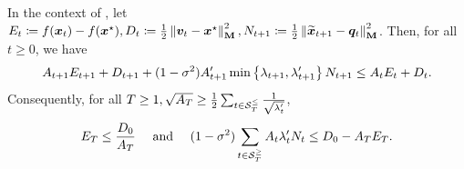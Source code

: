 \begin{lemma}
\label{lemma:ms_acceleration_potential}
In the context of , let $E_t \coloneqq f(\bm{x}_t) - f(\bm{x}^{\star}), D_t \coloneqq \frac{1}{2}\left\lVert \bm{v}_t-\bm{x}^{\star} \right\rVert_{\mathbf{M}}^2, N_{t+1} \coloneqq \frac{1}{2}\left\lVert \widetilde{\bm{x}}_{t+1}-\bm{q}_t \right\rVert_{\mathbf{M}}^2$. Then, for all $t \ge 0$, we have
\begin{align*}
    A_{t+1}E_{t+1}+D_{t+1}+(1-\sigma^2)A_{t+1}'\min\left\{\lambda_{t+1},\lambda_{t+1}'\right\}N_{t+1} \le A_tE_t+D_t.
\end{align*}
Consequently, for all $T\ge1, \sqrt{A_T}\ge\frac{1}{2}\sum_{t \in \mathcal{S}_{T}^{\le}} \frac{1}{\sqrt{\lambda_t'}}$,
\begin{align*}
    E_{T} \le \frac{D_0}{A_T} \quad \text{ and } \quad (1-\sigma^2)\sum_{t \in \mathcal{S}_{T}^{\ge}} A_t\lambda_t'N_t \le D_0 - A_TE_T.
\end{align*}
\end{lemma}
